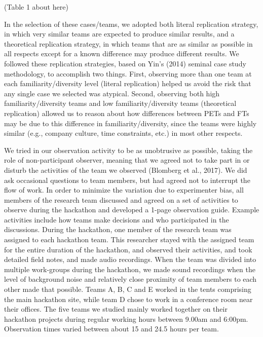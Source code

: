 \documentclass{hcij}
\begin{document}
(Table 1 about here)

In the selection of these cases/teams, we adopted both literal replication strategy, in which very similar teams are expected to produce similar results, and a theoretical replication strategy, in which teams that are as similar as possible in all respects except for a known difference may produce different results. We followed these replication strategies, based on Yin’s (2014) seminal case study methodology, to accomplish two things. First, observing more than one team at each familiarity/diversity level (literal replication) helped us avoid the risk that any single case we selected was atypical. Second, observing both high familiarity/diversity teams and low familiarity/diversity teams (theoretical replication) allowed us to reason about how differences between PETs and FTs may be due to this difference in familiarity/diversity, since the teams were highly similar (e.g., company culture, time constraints, etc.) in most other respects.

We tried in our observation activity to be as unobtrusive as possible, taking the role of non-participant observer, meaning that we agreed not to take part in or disturb the activities of the team we observed (Blomberg et al., 2017). We did ask occasional questions to team members, but had agreed not to interrupt the flow of work. In order to minimize the variation due to experimenter bias, all members of the research team discussed and agreed on a set of activities to observe during the hackathon and developed a 1-page observation guide. Example activities include how teams make decisions and who participated in the discussions. During the hackathon, one member of the research team was assigned to each hackathon team. This researcher stayed with the assigned team for the entire duration of the hackathon, and observed their activities, and took detailed field notes, and made audio recordings. When the team was divided into multiple work-groups during the hackathon, we made sound recordings when the level of background noise and relatively close proximity of team members to each other made that possible. Teams A, B, C and E worked in the tents comprising the main hackathon site, while team D chose to work in a conference room near their offices. The five teams we studied mainly worked together on their hackathon projects during regular working hours between 9.00am and 6:00pm. Observation times varied between about 15 and 24.5 hours per team.
\end{document}

